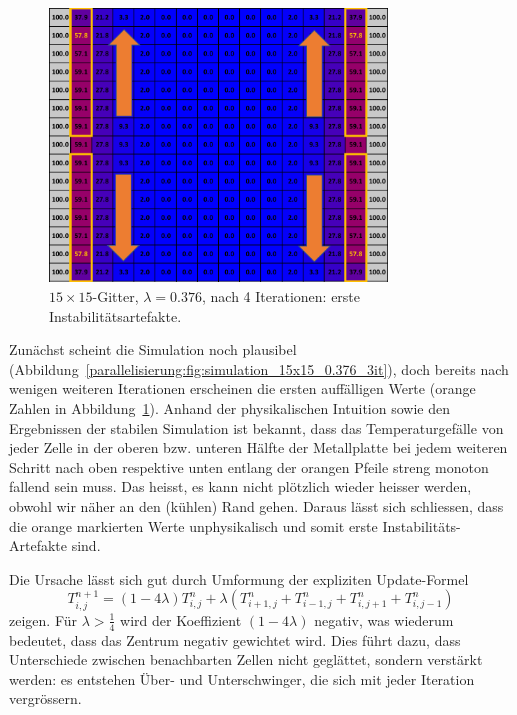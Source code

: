 \begin{figure}[htbp]
	\centering
	\includegraphics[width=0.8\textwidth]{papers/parallelisierung/images/simulation_15x15_0.376_4it.pdf}
	\caption{\(15\times 15\)-Gitter, \(\lambda = 0.376\), nach 4 Iterationen: erste Instabilitätsartefakte.}
	\label{parallelisierung:fig:simulation_15x15_0.376_4it}
\end{figure}

Zunächst scheint die Simulation noch plausibel (Abbildung~\ref{parallelisierung:fig:simulation_15x15_0.376_3it}), doch bereits nach wenigen weiteren Iterationen erscheinen die ersten auffälligen Werte (orange Zahlen in Abbildung~\ref{parallelisierung:fig:simulation_15x15_0.376_4it}). Anhand der physikalischen Intuition sowie den Ergebnissen der stabilen Simulation ist bekannt, dass das Temperaturgefälle von jeder Zelle in der oberen bzw. unteren Hälfte der Metallplatte bei jedem weiteren Schritt nach oben respektive unten entlang der orangen Pfeile streng monoton fallend sein muss. Das heisst, es kann nicht plötzlich wieder heisser werden, obwohl wir näher an den (kühlen) Rand gehen. Daraus lässt sich schliessen, dass die orange markierten Werte unphysikalisch und somit erste Instabilitäts-Artefakte sind.


Die Ursache lässt sich gut durch Umformung der expliziten Update-Formel 
\begin{equation}
	T_{i,j}^{n+1}
	=
	(1-4\lambda)T_{i,j}^n +
	\lambda \left(
	T_{i+1,j}^n + T_{i-1,j}^n + T_{i,j+1}^n + T_{i,j-1}^n
	\right)
\end{equation}
zeigen.
Für \(\lambda > \tfrac14\) wird der Koeffizient \((1-4\lambda)\) negativ, was wiederum bedeutet, dass das Zentrum negativ gewichtet wird.  
Dies führt dazu, dass Unterschiede zwischen benachbarten Zellen nicht geglättet, sondern verstärkt werden: es entstehen Über- und Unterschwinger, die sich mit jeder Iteration vergrössern.

